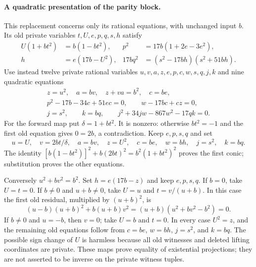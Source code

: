 \documentclass[11pt]{article}
\theoremstyle{definition}
\theoremstyle{remark}
\begin{document}
\paragraph{A quadratic presentation of the parity block.}
This replacement concerns only its rational equations, with unchanged
input $b$. Its old private variables $t,U,e,p,q,s,h$ satisfy
\begin{align*}
 U(1+bt^2)&=b(1-bt^2),&
 p^2&=17b(1+2e-3e^2),\\
 h&=e(17b-U^2),&
 17bq^2&=(s^2-17bh)(s^2+51bh).
\end{align*}
Use instead twelve private rational variables
$u,v,a,z,e,p,c,w,s,q,j,k$ and nine quadratic equations
\begin{gather*}
 z=u^2,\quad a=bv,\quad z+va=b^2,\quad c=be,\\
 p^2-17b-34c+51ec=0,\qquad w-17bc+cz=0,\\
 j=s^2,\qquad k=bq,\qquad
 j^2+34jw-867w^2-17qk=0.
\end{gather*}
For the forward map put $\delta=1+bt^2$. It is nonzero: otherwise
$bt^2=-1$ and the first old equation gives $0=2b$, a contradiction.
Keep $e,p,s,q$ and set
\[
 u=U,\quad v=2bt/\delta,\quad a=bv,\quad z=U^2,\quad
 c=be,\quad w=bh,\quad j=s^2,\quad k=bq.
\]
The identity
$[b(1-bt^2)]^2+b(2bt)^2=b^2(1+bt^2)^2$ proves the first conic;
substitution proves the other equations.

Conversely $u^2+bv^2=b^2$. Set $h=e(17b-z)$ and keep $e,p,s,q$.
If $b=0$, take $U=t=0$. If $b\ne0$ and $u+b\ne0$, take
$U=u$ and $t=v/(u+b)$. In this case the first old residual, multiplied
by $(u+b)^2$, is
\[
 (u-b)(u+b)^2+b(u+b)v^2
       =(u+b)(u^2+bv^2-b^2)=0.
\]
If $b\ne0$ and $u=-b$, then $v=0$; take $U=b$ and $t=0$.
In every case $U^2=z$, and the remaining old equations follow from
$c=be$, $w=bh$, $j=s^2$, and $k=bq$. The possible sign change of $U$
is harmless because all old witnesses and deleted lifting coordinates
are private. These maps prove equality of existential projections;
they are not asserted to be inverse on the private witness tuples.
\end{document}
